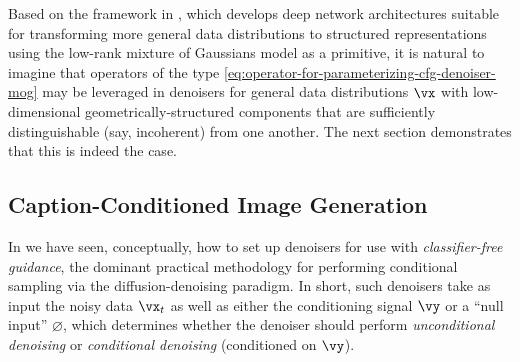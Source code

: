 \documentclass[../../book-main.tex]{subfiles}
\begin{document}
Based on the framework in , which develops deep network
architectures suitable for transforming more general data distributions to
structured representations using the low-rank mixture of Gaussians model as
a primitive, it is natural to imagine that operators of the type
\eqref{eq:operator-for-parameterizing-cfg-denoiser-mog} may be leveraged in
denoisers for
general data distributions $\vx$ with low-dimensional geometrically-structured
components that are sufficiently distinguishable (say, incoherent) from one
another.
The next section demonstrates that this is indeed the case.

\subsection{Caption-Conditioned Image Generation}\label{sub:text-cond}
In  we have seen, conceptually, how to set up denoisers
for use with
\textit{classifier-free guidance}, the dominant practical methodology for
performing conditional sampling via the diffusion-denoising paradigm.
In short, such denoisers take as input the noisy data $\vx_t$ as well
as either the conditioning signal $\vy$ or a ``null input'' $\varnothing$,
which determines whether the denoiser should perform \textit{unconditional
denoising} or \textit{conditional denoising} (conditioned on $\vy$).
\end{document}
